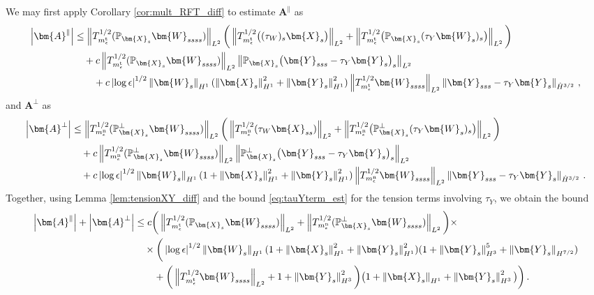 \documentclass[11pt,reqno]{amsart}
\renewcommand{\P}{\mathbb{P}}
\newcommand{\X}{\bm{X}}
\newcommand{\Y}{\bm{Y}}
\newcommand{\abs}[1]{\left\lvert #1 \right\rvert}
\newcommand{\norm}[1]{\left\lVert #1 \right\rVert}
\numberwithin{equation}{section}
\theoremstyle{definition}
\begin{document}
We may first apply Corollary \ref{cor:mult_RFT_diff} to estimate $\bm{A}^\parallel$ as 
\begin{equation}
\begin{aligned}
  \abs{\bm{A}^\parallel} &\le \norm{T_{m_\epsilon^{\rm t}}^{1/2}(\P_{\X_s}\bm{W}_{ssss})}_{L^2}\bigg(\norm{T_{m_\epsilon^{\rm t}}^{1/2}\big((\tau_W)_s\X_s\big)}_{L^2}+\norm{T_{m_\epsilon^{\rm t}}^{1/2}\big(\P_{\X_s}(\tau_Y\bm{W}_s)_s\big)}_{L^2} \bigg) \\
  &\quad + c\norm{T_{m_\epsilon^{\rm t}}^{1/2}(\P_{\X_s}\bm{W}_{ssss})}_{L^2}\norm{\P_{\X_s}\big(\Y_{sss}-\tau_Y\Y_s \big)_s}_{L^2}\\
  &\qquad + c\abs{\log\epsilon}^{1/2}\norm{\bm{W}_s}_{H^1}(\norm{\X_s}_{H^1}^2+\norm{\Y_s}_{H^1}^2)\norm{T_{m_\epsilon^{\rm t}}^{1/2}\bm{W}_{ssss}}_{L^2}\norm{\Y_{sss}-\tau_Y\Y_s }_{\dot H^{3/2}}\,,
\end{aligned}
\end{equation}
and $\bm{A}^\perp$ as 
\begin{equation}
\begin{aligned}
  \abs{\bm{A}^\perp} &\le \norm{T_{m_\epsilon^{\rm n}}^{1/2}(\P_{\X_s}^\perp\bm{W}_{ssss})}_{L^2}\bigg( \norm{T_{m_\epsilon^{\rm n}}^{1/2}(\tau_W\X_{ss})}_{L^2}
  + \norm{T_{m_\epsilon^{\rm n}}^{1/2}\big(\P_{\X_s}^\perp(\tau_Y\bm{W}_s)_s \big)}_{L^2}\bigg) \\
  &\quad + c\norm{T_{m_\epsilon^{\rm n}}^{1/2}(\P_{\X_s}^\perp\bm{W}_{ssss})}_{L^2}\norm{\P_{\X_s}^\perp\big(\Y_{sss}-\tau_Y\Y_s \big)_s}_{L^2}\\
  &\quad + c\abs{\log\epsilon}^{1/2}\norm{\bm{W}_s}_{H^1}(1+\norm{\X_s}_{H^1}^2+\norm{\Y_s}_{H^1}^2)\norm{T_{m_\epsilon^{\rm n}}^{1/2}\bm{W}_{ssss}}_{L^2}\norm{\Y_{sss}-\tau_Y\Y_s}_{\dot H^{3/2}}\,.
\end{aligned}
\end{equation}
%
%
Together, using Lemma \ref{lem:tensionXY_diff} and the bound \eqref{eq:tauYterm_est} for the tension terms involving $\tau_Y$, we obtain the bound
\begin{equation}\label{eq:AparAperp}
\begin{aligned}
  \abs{\bm{A}^\parallel}+\abs{\bm{A}^\perp} &\le c\bigg(\norm{T_{m_\epsilon^{\rm t}}^{1/2}(\P_{\X_s}\bm{W}_{ssss})}_{L^2}+\norm{T_{m_\epsilon^{\rm n}}^{1/2}(\P_{\X_s}^\perp\bm{W}_{ssss})}_{L^2}\bigg)\times\\
  &\quad\times \bigg(\abs{\log\epsilon}^{1/2}\norm{\bm{W}_s}_{H^1}(1+\norm{\X_s}_{H^1}^2+\norm{\Y_s}_{H^1}^2)(1+\norm{\Y_s}_{H^3}^5+ \norm{\Y_s}_{H^{7/2}}) \\
  &\qquad + \bigg(\norm{T_{m_\epsilon^{\rm t}}^{1/2}\bm{W}_{ssss}}_{L^2}+ 1+\norm{\Y_s}_{H^3}^2\bigg)\big(1+\norm{\X_s}_{H^1}+\norm{\Y_s}_{H^3}^2\big)\bigg)\,.
\end{aligned}
\end{equation}
\end{document}
